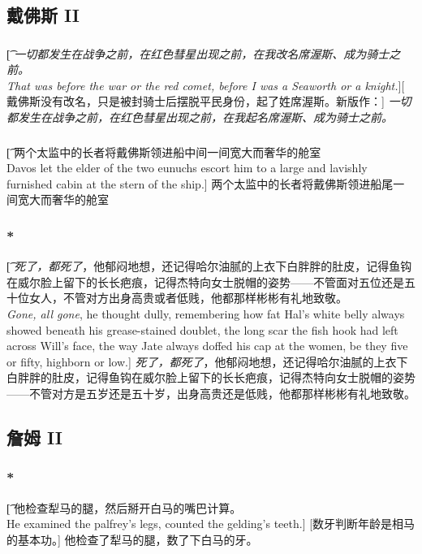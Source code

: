 \documentclass[12pt,a4paper]{article}
\begin{document}
\subsection{戴佛斯 II}
\subsubsection{}\t[
	\emph{一切都发生在战争之前，在红色彗星出现之前，在我改名席渥斯、成为骑士之前。}\\
	\emph{That was before the war or the red comet, before I was a Seaworth or a knight.}][
	戴佛斯没有改名，只是被封骑士后摆脱平民身份，起了姓席渥斯。新版作：]
	\emph{一切都发生在战争之前，在红色彗星出现之前，在我起名席渥斯、成为骑士之前。}
	
\subsubsection{}\t[
	两个太监中的长者将戴佛斯领进船中间一间宽大而奢华的舱室\\
	Davos let the elder of the two eunuchs escort him to a large and lavishly furnished cabin at the stern of the ship.]
	两个太监中的长者将戴佛斯领进船尾一间宽大而奢华的舱室
	
\subsubsection{\color{red}*}\t[
	\emph{死了，都死了}，他郁闷地想，还记得哈尔油腻的上衣下白胖胖的肚皮，记得鱼钩在威尔脸上留下的长长疤痕，记得杰特向女士脱帽的姿势——不管面对五位还是五十位女人，不管对方出身高贵或者低贱，他都那样彬彬有礼地致敬。\\
	\emph{Gone, all gone}, he thought dully, remembering how fat Hal's white belly always showed beneath his grease-stained doublet, the long scar the fish hook had left across Will's face, the way Jate always doffed his cap at the women, be they five or fifty, highborn or low.]
	\emph{死了，都死了}，他郁闷地想，还记得哈尔油腻的上衣下白胖胖的肚皮，记得鱼钩在威尔脸上留下的长长疤痕，记得杰特向女士脱帽的姿势——不管对方是五岁还是五十岁，出身高贵还是低贱，他都那样彬彬有礼地致敬。
	
	
\subsection{詹姆 II}
\subsubsection{\color{red}*}\t[		
他检查犁马的腿，然后掰开白马的嘴巴计算。\\		
He examined the palfrey's legs, counted the gelding's teeth.]		
[数牙判断年龄是相马的基本功。]		
他检查了犁马的腿，数了下白马的牙。
\end{document}
